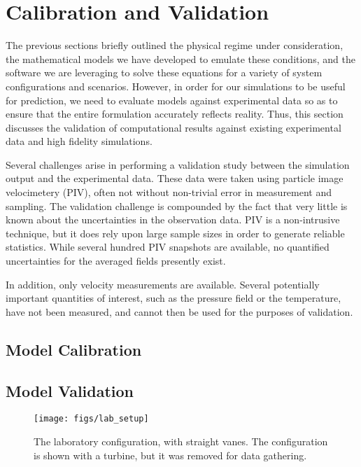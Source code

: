
\section{Calibration and Validation}
\label{sec:validation}

%
%

The previous sections briefly outlined the physical regime under
consideration, the mathematical models we have developed to emulate
these conditions, and the software we are leveraging to solve these
equations for a variety of system configurations and scenarios. 
However, in order for our simulations to be useful for prediction, we
need to evaluate models against experimental data so
as to ensure that the entire formulation accurately reflects reality. 
Thus, this section discusses the validation of computational results
against existing experimental data and high fidelity simulations.

%
%
Several challenges arise in performing a validation study between the
simulation output and the experimental data. These data were taken using
particle image velocimetery (PIV), often not without non-trivial error
in measurement and sampling. 
The validation challenge is compounded by the fact that very little is
known about the uncertainties in the observation data. PIV is a
non-intrusive technique, but it does rely upon large sample sizes in
order to generate reliable statistics. While several hundred PIV
snapshots are available, no quantified uncertainties for the averaged fields
presently exist.  

In addition, only velocity measurements are available. Several
potentially important quantities of interest, such as the pressure field
or the temperature, have not been measured, and cannot then be used for
the purposes of validation. 



\subsection{Model Calibration}

%
% 


\subsection{Model Validation}


  \begin{figure}[!htb]
    \begin{center}
     \texttt{[image: figs/lab\_setup]}
     \caption{The laboratory configuration, with straight vanes. The
     configuration is shown with a turbine, but it was removed for data
     gathering.}
     \label{fig:lab}
    \end{center}
  \end{figure}

